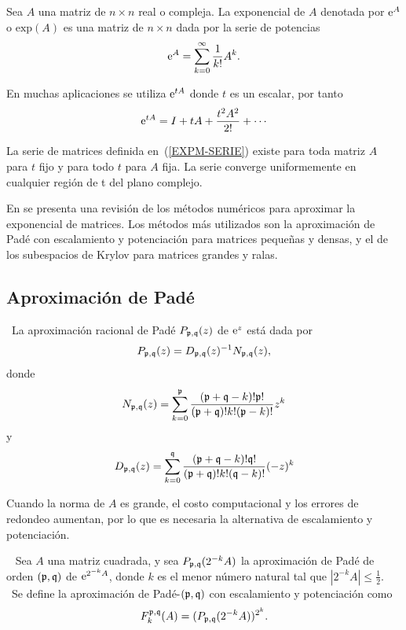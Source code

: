 \begin{definition}
    \label{EXPM}\cite{golub2013matrix} Sea $A$ una matriz de $n\times n$ real o compleja. La exponencial de $A$ denotada por
    $ \mathrm{e}^{A} $ o $\mathrm{exp}(A)$ es una matriz de $n\times n$ dada por la serie de potencias
    \[\mathrm{e}^{A}=\sum_{k=0}^{\infty}\frac{1}{k!}A^{k}.\]
\end{definition}
En muchas aplicaciones se utiliza $\mathrm{e}^{tA}$ donde $t$ es un escalar, por tanto 
\begin{equation}
\me{tA}=I+tA+\frac{t^{2}A^{2}}{2!}+\cdots\label{EXPM-SERIE}
\end{equation}
\begin{theorem}\cite{IntroMatrix}
    La serie de matrices definida en~(\ref{EXPM-SERIE}) existe para toda matriz $A$ para $t$ fijo y
    para todo $t$ para $A$ fija. La serie converge uniformemente en cualquier región de t del plano complejo.
\end{theorem}

En \cite{moler2003nineteen} se presenta una revisión de los métodos numéricos
para aproximar
la exponencial de matrices. Los métodos más utilizados son la aproximación de Padé con escalamiento
y potenciación para matrices pequeñas y densas, y el de los subespacios de Krylov para matrices grandes y ralas.


\subsection{Aproximación de Padé}\label{section:pade-approx}
\begin{definition}
    \cite{golub2013matrix}~La aproximación racional de Padé $P_{\mathfrak{p},\mathfrak{q}}(z)$
    de $\mathrm{e}^{z}$ está dada por 
    \begin{equation*}
    P_{\mathfrak{p},\mathfrak{q}}(z)=D_{\mathfrak{p},\mathfrak{q}}(z)^{-1}N_{\mathfrak{p},\mathfrak{q}}(z),  \label{FORM PADE}
    \end{equation*}%
    donde 
    \[
    N_{\mathfrak{p},\mathfrak{q}}(z)=\sum\limits_{k=0}^{\mathfrak{p}}\frac{(\mathfrak{p}+\mathfrak{q}-k)!\mathfrak{p}!}{(\mathfrak{p}+\mathfrak{q})!k!(\mathfrak{p}-k)!}z^k
    \]%
    y 
    \[
    D_{\mathfrak{p},\mathfrak{q}}(z)=\sum\limits_{k=0}^{\mathfrak{q}}\frac{(\mathfrak{p}+\mathfrak{q}-k)!\mathfrak{q}!}{(\mathfrak{p}+\mathfrak{q})!k!(\mathfrak{q}-k)!}(-z)^k
    \]
\end{definition}

Cuando la norma de   $A$ es grande, el costo computacional y los errores de redondeo  aumentan, por lo que
es necesaria la alternativa de escalamiento y potenciación.

\begin{definition}\cite{golub2013matrix}~
    Sea $A$ una matriz cuadrada, y sea $P_{\pf,\qf}(2^{-k}A%
    )$ la aproximación de Padé de orden $(\mathfrak{p},\mathfrak{q})\ $de $\me{2^{-k}A%
    }$, donde $k$ es el menor número natural tal que $\left\vert 2^{-k}A%
    \right\vert \leq \frac{1}{2}$. \ Se define la aproximación de  Padé-$(\mathfrak{p},\mathfrak{q})$ con escalamiento y potenciación como 
    \begin{equation}
    F_{k}^{\mathfrak{p},\mathfrak{q}}(A)=(P_{\mathfrak{p},\mathfrak{q}}(2^{-k}A))^{2^{k}}.
    \label{P-MA-2}
    \end{equation}
\end{definition}

